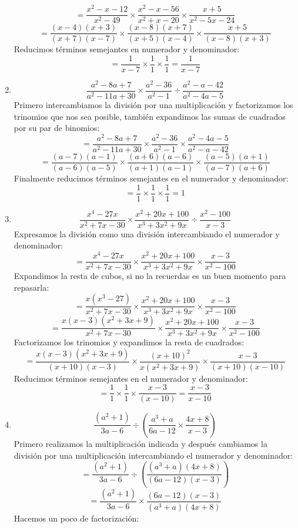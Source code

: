 \documentclass[12pt]{article}
\begin{document}
\begin{enumerate}[label=\bfseries Ejercicio \arabic*:]
$$= \frac{x^2 - x - 12}{x^2 - 49} \times \frac{x^2 - x - 56}{x^2 + x - 20} \times \frac{x + 5}{x^2 - 5x - 24}$$
$$= \frac{(x - 4)(x + 3)}{(x + 7)(x - 7)} \times \frac{(x - 8)(x + 7)}{(x + 5)(x - 4)} \times \frac{x+5}{(x - 8)(x + 3)}$$
Reducimos términos semejantes en numerador y denominador:
$$= \frac{1}{x - 7} \times \frac{1}{1} \times \frac{1}{1} = \frac{1}{x - 7} $$
  \item $$\frac{a^2 - 8a + 7}{a^2 - 11a + 30} \times \frac{a^2 - 36}{a^2 - 1} \div \frac{a^2 - a -42}{a^2 - 4a - 5}$$
Primero intercambiamos la división por una multiplicación y factorizamos los trinomios que nos sea posible, también expandimos las sumas de cuadrados por su par de binomios:
$$= \frac{a^2 - 8a + 7}{a^2 - 11a + 30} \times \frac{a^2 - 36}{a^2 - 1} \times \frac{a^2 - 4a - 5}{a^2 - a -42}$$
$$= \frac{(a - 7)(a - 1)}{(a - 6)(a - 5)} \times \frac{(a + 6)(a - 6)}{(a + 1)(a - 1)} \times \frac{(a - 5)(a + 1)}{(a - 7)(a + 6)}$$
Finalmente reducimos términos semejantes en el numerador y denominador:
$$= \frac{1}{1} \times \frac{1}{1} \times \frac{1}{1} = 1$$
  \item $$\frac{x^4 - 27x}{x^2 + 7x - 30} \times \frac{x^2 + 20x + 100}{x^3 + 3x^2 + 9x} \div \frac{x^2 - 100}{x - 3}$$
Expresamos la división como una división intercambiando el numerador y denominador:
$$= \frac{x^4 - 27x}{x^2 + 7x - 30} \times \frac{x^2 + 20x + 100}{x^3 + 3x^2 + 9x} \times \frac{x - 3}{x^2 - 100}$$
Expandimos la resta de cubos, si no la recuerdas es un buen momento para repasarla:
$$= \frac{x(x^3 - 27)}{x^2 + 7x - 30} \times \frac{x^2 + 20x + 100}{x^3 + 3x^2 + 9x} \times \frac{x - 3}{x^2 - 100}$$
$$= \frac{x(x - 3)(x^2 + 3x + 9)}{x^2 + 7x - 30} \times \frac{x^2 + 20x + 100}{x^3 + 3x^2 + 9x} \times \frac{x - 3}{x^2 - 100}$$
Factorizamos los trinomios y expandimos la resta de cuadrados:
$$= \frac{x(x - 3)(x^2 + 3x + 9)}{(x + 10)(x - 3)} \times \frac{(x + 10)^2}{x(x^2 + 3x + 9)} \times \frac{x - 3}{(x + 10)(x - 10)}$$
Reducimos términos semejantes en el numerador y denominador:
$$= \frac{1}{1} \times \frac{1}{1} \times \frac{x - 3}{(x - 10)} = \frac{x - 3}{x - 10}$$
  \item $$\frac{(a^2 + 1)}{3a -6} \div \left( \frac{a^3 +a}{6a - 12} \times \frac{4x + 8}{x - 3} \right)$$
Primero realizamos la multiplicación indicada y después cambiamos la división por una multiplicación intercambiando el numerador y denominador:
$$= \frac{(a^2 + 1)}{3a -6} \div \left( \frac{(a^3 +a)(4x + 8)}{(6a - 12)(x - 3)} \right)$$
$$= \frac{(a^2 + 1)}{3a -6} \times \frac{(6a - 12)(x - 3)}{(a^3 +a)(4x + 8)}$$
Hacemos un poco de factorización:

\end{enumerate}
\end{document}
